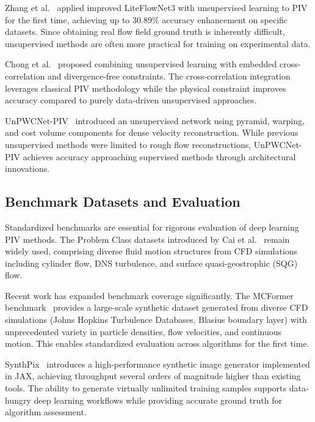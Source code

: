 Zhang et al.~\cite{zhang2023unsupervised_liteflownet3} applied improved LiteFlowNet3 with unsupervised learning to PIV for the first time, achieving up to 30.89\% accuracy enhancement on specific datasets. Since obtaining real flow field ground truth is inherently difficult, unsupervised methods are often more practical for training on experimental data.

Chong et al.~\cite{chong2022unsupervised_crosscorr} proposed combining unsupervised learning with embedded cross-correlation and divergence-free constraints. The cross-correlation integration leverages classical PIV methodology while the physical constraint improves accuracy compared to purely data-driven unsupervised approaches.

UnPWCNet-PIV~\cite{zhang2023unpwcnet} introduced an unsupervised network using pyramid, warping, and cost volume components for dense velocity reconstruction. While previous unsupervised methods were limited to rough flow reconstructions, UnPWCNet-PIV achieves accuracy approaching supervised methods through architectural innovations.

\subsection{Benchmark Datasets and Evaluation}

Standardized benchmarks are essential for rigorous evaluation of deep learning PIV methods. The Problem Class datasets introduced by Cai et al.~\cite{cai2019piv_liteflownet} remain widely used, comprising diverse fluid motion structures from CFD simulations including cylinder flow, DNS turbulence, and surface quasi-geostrophic (SQG) flow.

Recent work has expanded benchmark coverage significantly. The MCFormer benchmark~\cite{mcformer2024} provides a large-scale synthetic dataset generated from diverse CFD simulations (Johns Hopkins Turbulence Databases, Blasius boundary layer) with unprecedented variety in particle densities, flow velocities, and continuous motion. This enables standardized evaluation across algorithms for the first time.

SynthPix~\cite{synthpix2024} introduces a high-performance synthetic image generator implemented in JAX, achieving throughput several orders of magnitude higher than existing tools. The ability to generate virtually unlimited training samples supports data-hungry deep learning workflows while providing accurate ground truth for algorithm assessment.

